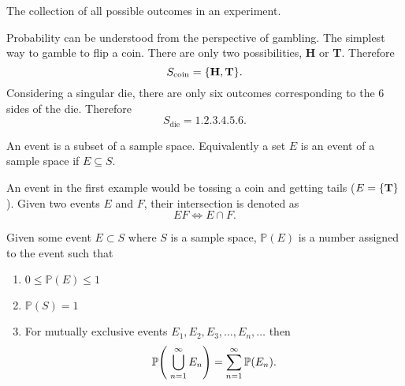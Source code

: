 \documentclass[../notes.tex]{subfiles}
\begin{document}

\begin{definition}
	The collection of all possible outcomes in an experiment.
\end{definition}

Probability can be understood from the perspective of gambling. The simplest way to gamble to flip a coin. There are only two possibilities, \textbf{H} or \textbf{T}. Therefore
\[
	S_{\text{coin}} = \qty{ \textbf{H}, \textbf{T} }
.\]
Considering a singular die, there are only six outcomes corresponding to the 6 sides of the die. Therefore
\[
	S_{\text{die}} = \qty{1,2,3,4,5,6}
.\]

\begin{definition}
	An event is a subset of a sample space. Equivalently a set $E$ is an event of a sample space if $E \subseteq S$.
\end{definition}
An event in the first example would be tossing a coin and getting tails ($E = \qty{\textbf{T}}$). Given two events $E$ and $F$, their intersection is denoted as
\[
	EF \Leftrightarrow E \cap F
.\]

\begin{definition}[Probability]
	Given some event $E \subset S$ where $S$ is a sample space, $\mathbb{P}(E)$ is a number assigned to the event such that
	\begin{enumerate}
		\item $0 \leq \mathbb{P}(E) \leq 1$
		\item $\mathbb{P}(S) = 1$
		\item For mutually exclusive events $E_1, E_2, E_3, \ldots, E_n, \ldots$ then
			\[
				\mathbb{P}\qty(\;\bigcup_{n=1}^\infty E_n) = \sum_{n=1}^\infty \mathbb{P}(E_n)
			.\]
	\end{enumerate}
\end{definition}
\end{document}
